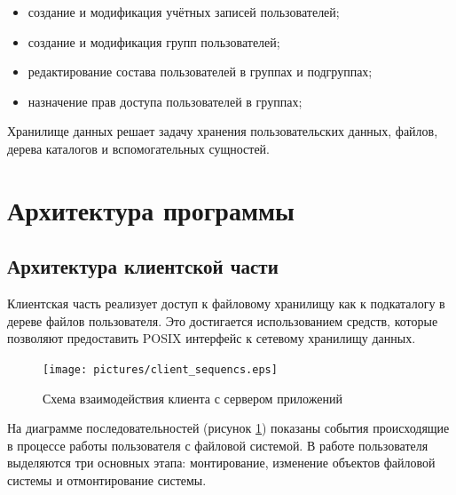 \documentclass[utf8,usehyperref,12pt]{G7-32}
\begin{document}
\begin{itemize}
	\item создание и модификация учётных записей пользователей;
	\item создание и модификация групп пользователей;
	\item редактирование состава пользователей в группах и подгруппах;
	\item назначение прав доступа пользователей в группах;
\end{itemize}

Хранилище данных решает задачу хранения пользовательских данных, файлов, дерева каталогов и вспомогательных сущностей.


\section{Архитектура программы}
\subsection{Архитектура клиентской части}

Клиентская часть реализует доступ к файловому хранилищу как к подкаталогу в дереве файлов пользователя. Это достигается использованием средств, которые позволяют предоставить POSIX интерфейс к сетевому хранилищу данных.

\begin{figure}[ht]
   \centering%
   \texttt{[image: pictures/client\_sequencs.eps]}
   \caption{Схема взаимодействия клиента с сервером приложений}\label{fig:client_sequence}
 \end{figure}

На диаграмме последовательностей (рисунок \ref{fig:client_sequence}) показаны события происходящие в процессе работы пользователя с файловой системой. В работе пользователя выделяются три основных этапа: монтирование, изменение объектов файловой системы и отмонтирование системы. 
\end{document}
